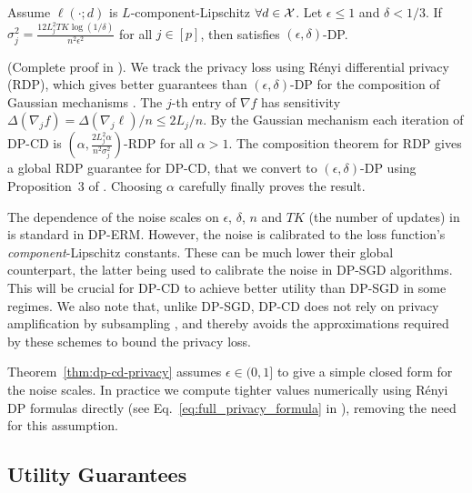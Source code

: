 \begin{theorem}
  \label{thm:dp-cd-privacy}
  Assume $\ell(\cdot;d)$ is $L$-component-Lipschitz $\forall d\in\mathcal X$.
  Let $\epsilon \leq 1$ and $\delta < 1/3$.
  If $\sigma_j^2 = \frac{12L_j^2 TK \log(1/\delta)}{n^2\epsilon^2}$
  for all $j \in [p]$,
  then  satisfies $(\epsilon, \delta)$-DP.
\end{theorem}
\begin{sketchproof}(Complete proof in ).
  We track the privacy loss using Rényi differential privacy (RDP),
  which gives better guarantees than $(\epsilon,\delta)$-DP for the
  composition
  of Gaussian mechanisms \citep{mironov2017Renyi}.  The
  $j$\nobreakdash-th entry of $\nabla f$ has sensitivity
  $\Delta(\nabla_j f) = {\Delta(\nabla_j \ell)}/{n} \le {2L_j}/{n}$.
  By the Gaussian mechanism each iteration of DP-CD is
  $(\alpha, \frac{2 L_j^2 \alpha}{n^2\sigma_j^2})$-RDP for all
  $\alpha > 1$. The composition theorem for RDP gives a global RDP
  guarantee for DP-CD, that we convert to $(\epsilon,\delta)$-DP using
  Proposition~3 of \citet{mironov2017Renyi}. Choosing $\alpha$
  carefully finally proves the result.
\end{sketchproof}


The dependence of the noise scales on $\epsilon$, $\delta$, $n$ and
$TK$ (the number of updates) in  is standard
in DP-ERM. However, the noise is calibrated to the loss function's
\emph{component}-Lipschitz constants. These can be much lower their
global counterpart, the latter being used to calibrate the noise
in DP-SGD algorithms. This will be crucial for DP-CD to achieve better utility
than DP-SGD in some regimes.
We also note that, unlike DP-SGD, DP-CD does not rely on privacy
amplification by subsampling \citep{Balle_subsampling,mironov2019Enyi}, and
thereby avoids the approximations required by these
schemes to bound the privacy loss.

\begin{remark}
  Theorem~\ref{thm:dp-cd-privacy} assumes $\epsilon \in (0,1]$ to give
  a simple closed form for the noise scales. In practice we compute
  tighter values numerically using Rényi DP formulas directly (see
  Eq.~\ref{eq:full_privacy_formula} in ),
  removing the need for this assumption.
\end{remark}



\subsection{Utility Guarantees}
\label{sec:utiltity-analysis-cd}

